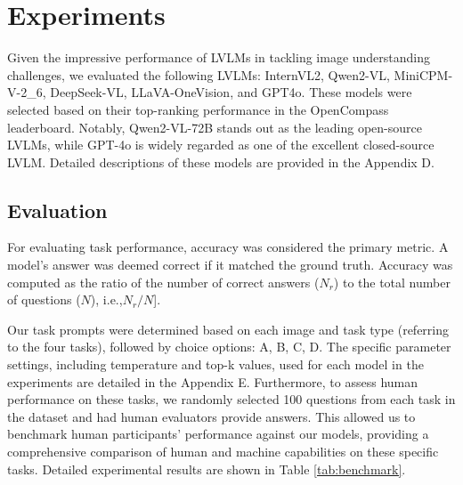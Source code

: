 \section{Experiments}
Given the impressive performance of LVLMs in tackling image understanding challenges, we evaluated the following LVLMs: InternVL2\cite{chen2024fargpt4vclosinggap}, Qwen2-VL\cite{wang2024qwen2vlenhancingvisionlanguagemodels}, MiniCPM-V-2\_6\cite{yao2024minicpmvgpt4vlevelmllm}, DeepSeek-VL\cite{lu2024deepseekvlrealworldvisionlanguageunderstanding}, LLaVA-OneVision\cite{li2024llavaonevisioneasyvisualtask}, and GPT4o\cite{achiam2023gpt}. These models were selected based on their top-ranking performance in the OpenCompass leaderboard\cite{contributorsopencompass}. Notably, Qwen2-VL-72B\cite{wang2024qwen2vlenhancingvisionlanguagemodels} stands out as the leading open-source LVLMs, while GPT-4o\cite{achiam2023gpt} is widely regarded as one of the excellent closed-source LVLM. Detailed descriptions of these models are provided in the Appendix D.

\subsection{Evaluation}
For evaluating task performance, accuracy was considered the primary metric. A model's answer was deemed correct if it matched the ground truth. Accuracy was computed as the ratio of the number of correct answers ($N_{r}$) to the total number of questions ($N$), i.e.,$N_{r}/N$].

Our task prompts were determined based on each image and task type (referring to the four tasks), followed by choice options: A, B, C, D. The specific parameter settings, including temperature and top-k values, used for each model in the experiments are detailed in the Appendix E. Furthermore, to assess human performance on these tasks, we randomly selected 100 questions from each task in the dataset and had human evaluators provide answers. This allowed us to benchmark human participants' performance against our models, providing a comprehensive comparison of human and machine capabilities on these specific tasks. Detailed experimental results are shown in Table \ref{tab:benchmark}.


